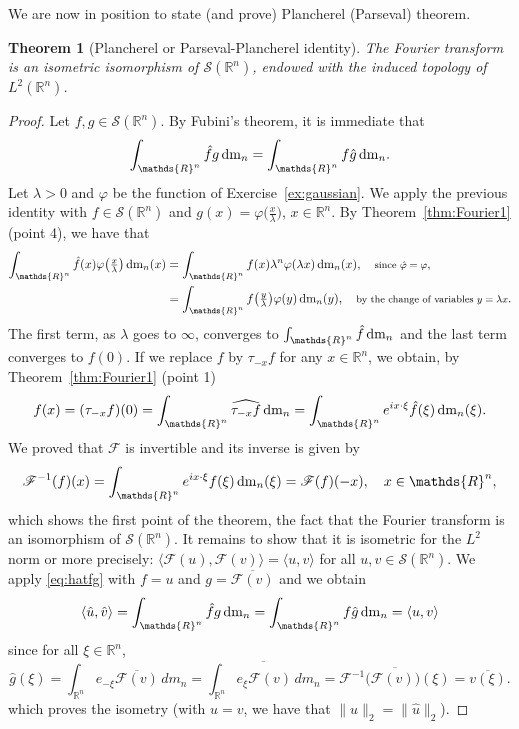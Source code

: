 \documentclass[a4paper, 12pt]{article}
\theoremstyle{plain}
\newtheorem{theorem}[proposition]{Theorem}
\theoremstyle{definition}
\theoremstyle{remark}
\numberwithin{equation}{section}
\begin{document}
We are now in position to state (and prove) Plancherel (Parseval) theorem.

\begin{theorem}[Plancherel or Parseval-Plancherel identity]
The Fourier transform is an isometric isomorphism of ${\mathscr{S}}({\mathds{R}}^n)$, endowed with the induced topology of 
$L^2({\mathds{R}}^n)$.
\end{theorem}

\begin{proof}
Let $f,g\in{\mathscr{S}}({\mathds{R}}^n)$. By Fubini's theorem, it is immediate that
%
\begin{equation}
\label{eq:hatfg}
\int_{{\mathds{R}}^n}\hat{f} g\,{\rm dm}_n =\int_{{\mathds{R}}^n} f \hat{g}\,{\rm dm}_n.
\end{equation}
%
Let $\lambda>0$ and $\varphi$ be the function of Exercise~\ref{ex:gaussian}. We apply the previous identity with 
$f\in{\mathscr{S}}({\mathds{R}}^n)$ and $g(x)=\varphi\bigl(\tfrac{x}{\lambda}\bigr)$, $x\in {\mathds{R}}^n$. By Theorem~\ref{thm:Fourier1}
(point 4),
we have that
%
\begin{align*}
\int_{{\mathds{R}}^n} \hat{f}(x) \varphi\bigl(\tfrac{x}{\lambda}\bigr)\,{\rm dm}_n(x)
&=\int_{{\mathds{R}}^n} f(x) \lambda^n\varphi(\lambda x)\,{\rm dm}_n(x),\quad \mbox{\footnotesize since $\hat{\varphi}=\varphi$},\\
&=\int_{{\mathds{R}}^n} f\bigl(\tfrac{y}{\lambda}\bigr) \varphi(y)\,{\rm dm}_n(y), \quad \mbox{\footnotesize by the change of variables $y=\lambda x$}.
\end{align*}
%
The first term, as $\lambda$ goes to $\infty$, converges to $\int_{{\mathds{R}}^n} \hat{f}\,{\rm dm}_n$ and the last term
converges to $f(0)$. If we replace $f$ by $\tau_{-x}f$ for any $x\in {\mathds{R}}^n$, we obtain, by Theorem~\ref{thm:Fourier1} (point 1)
\[
f(x)=(\tau_{-x}f)(0)=\int_{{\mathds{R}}^n} \widehat{\tau_{-x}f}\,{\rm dm}_n = \int_{{\mathds{R}}^n} e^{ix\cdot\xi}\hat{f}(\xi)\,{\rm dm}_n(\xi).
\]
We proved that ${\mathscr{F}}$ is invertible and its inverse is given by
%
\begin{equation}
\label{eq:inverseF}
{\mathscr{F}}^{-1}(f)(x)= \int_{{\mathds{R}}^n} e^{ix\cdot\xi} f(\xi)\,{\rm dm}_n(\xi) = {\mathscr{F}}(f)(-x), \quad x\in{\mathds{R}}^n,
\end{equation}
%
which shows the first point of the theorem, the fact that the Fourier transform is an isomorphism of ${\mathscr{S}}({\mathds{R}}^n)$. It
remains to show that it is isometric for the $L^2$ norm or more precisely: $\langle {\mathscr{F}}(u),{\mathscr{F}}(v)\rangle =\langle u,v\rangle$
for all $u,v\in{\mathscr{S}}({\mathds{R}}^n)$.
We apply \eqref{eq:hatfg} with $f=u$ and $g=\overline{{\mathscr{F}}(v)}$ and we obtain
\[
\langle \hat{u} ,\hat{v} \rangle= \int_{{\mathds{R}}^n}\hat{f} g\,{\rm dm}_n=\int_{{\mathds{R}}^n} f \hat{g}\,{\rm dm}_n =\langle u,v\rangle
\]
since for all $\xi\in{\mathds{R}}^n$,
\[
\hat{g}(\xi)=\int_{{\mathds{R}}^n}e_{-\xi}\overline{{\mathscr{F}}(v)}\, dm_n
=\overline{\int_{{\mathds{R}}^n}e_{\xi}{\mathscr{F}}(v)\, dm_n}=\overline{{\mathscr{F}}^{-1}\bigl({\mathscr{F}}(v)\bigr)(\xi)}=\overline{v(\xi)}.
\]
which proves the isometry (with $u=v$, we have that $\|u\|_2=\|\hat{u}\|_2$).
\end{proof}
\end{document}
